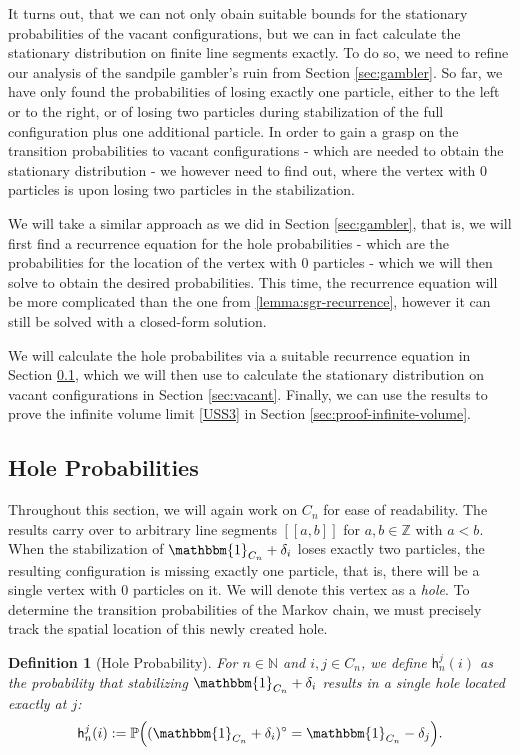 \documentclass[11pt]{article}
\newtheorem{definition}{Definition}[section]
\newcommand{\N}{\mathbb{N}}
\newcommand{\Z}{\mathbb{Z}}
\newcommand{\prob}{\mathbb{P}}
\newcommand{\one}{\mathbbm{1}}
\begin{document}
It turns out, that we can not only obain suitable bounds for the stationary probabilities of the vacant configurations, but we can in fact calculate the stationary distribution on finite line segments exactly. To do so, we need to refine our analysis of the sandpile gambler's ruin from Section \ref{sec:gambler}. So far, we have only found the probabilities of losing exactly one particle, either to the left or to the right, or of losing two particles during stabilization of the full configuration plus one additional particle. In order to gain a grasp on the transition probabilities to vacant configurations - which are needed to obtain the stationary distribution - we however need to find out, where the vertex with $0$ particles is upon losing two particles in the stabilization.

We will take a similar approach as we did in Section \ref{sec:gambler}, that is, we will first find a recurrence equation for the hole probabilities - which are the probabilities for the location of the vertex with $0$ particles - which we will then solve to obtain the desired probabilities. This time, the recurrence equation will be more complicated than the one from \ref{lemma:sgr-recurrence}, however it can still be solved with a closed-form solution.

We will calculate the hole probabilites via a suitable recurrence equation in Section \ref{sec:holes}, which we will then use to calculate the stationary distribution on vacant configurations in Section \ref{sec:vacant}. Finally, we can use the results to prove the infinite volume limit \ref{USS3} in Section \ref{sec:proof-infinite-volume}.

\subsection{Hole Probabilities}\label{sec:holes}

Throughout this section, we will again work on $C_n$ for ease of readability. The results carry over to arbitrary line segments $[[a,b]]$ for $a,b\in\Z$ with $a<b$. When the stabilization of $\one_{C_n} + \delta_i$ loses exactly two particles, the resulting configuration is missing exactly one particle, that is, there will be a single vertex with $0$ particles on it. We will denote this vertex as a {\it hole}. To determine the transition probabilities of the Markov chain, we must precisely track the spatial location of this newly created hole.

\begin{definition}[Hole Probability]
    For $n \in \N$ and $i, j \in C_n$, we define $\mathsf{h}_n^j(i)$ as the probability that stabilizing $\one_{C_n} + \delta_i$ results in a single hole located exactly at $j$:
    \begin{equation*}
        \mathsf{h}_n^j(i) := \prob\Big( (\one_{C_n} + \delta_i)^\circ = \one_{C_n} - \delta_j \Big).
    \end{equation*}
\end{definition}
\end{document}
